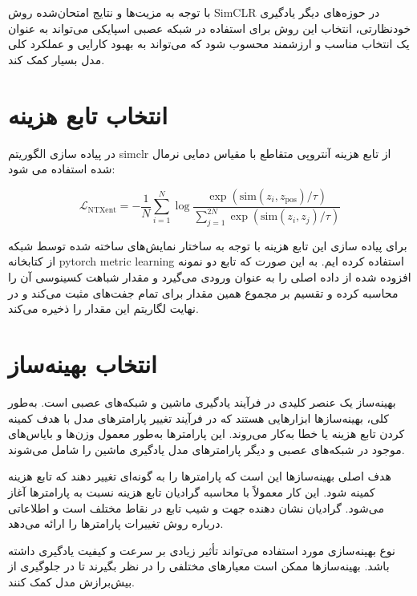 با توجه به مزیت‌ها و نتایج امتحان‌شده روش SimCLR در حوزه‌های دیگر یادگیری خودنظارتی، انتخاب این روش برای استفاده در شبکه عصبی اسپایکی می‌تواند به عنوان یک انتخاب مناسب و ارزشمند محسوب شود که می‌تواند به بهبود کارایی و عملکرد کلی مدل بسیار کمک کند.







\section{انتخاب تابع هزینه}

در پیاده سازی الگوریتم simclr از تابع هزینه آنتروپی متقاطع با مقیاس دمایی نرمال شده استفاده می شود:


\begin{equation}
	\mathcal{L}_{\text{NTXent}} = -\frac{1}{N} \sum_{i=1}^{N} \log \frac{\exp(\text{sim}(z_i, z_{\text{pos}}) / \tau)}{\sum_{j=1}^{2N} \exp(\text{sim}(z_i, z_j) / \tau)}
\end{equation}

برای پیاده سازی این تابع هزینه با توجه به ساختار نمایش‌های ساخته شده توسط شبکه از کتابخانه pytorch metric learning استفاده کرده ایم. به این صورت که تابع دو نمونه افزوده شده از داده اصلی را به عنوان ورودی می‌گیرد و مقدار شباهت کسینوسی آن را محاسبه کرده و تقسیم بر مجموع همین مقدار برای تمام جفت‌های مثبت می‌کند و در نهایت لگاریتم این مقدار را ذخیره می‌کند.



\section{انتخاب بهینه‌ساز}

بهینه‌ساز یک عنصر کلیدی در فرآیند یادگیری ماشین و شبکه‌های عصبی است. به‌طور کلی، بهینه‌سازها ابزارهایی هستند که در فرآیند تغییر پارامترهای مدل با هدف کمینه کردن تابع هزینه یا خطا به‌کار می‌روند. این پارامترها به‌طور معمول وزن‌ها و بایاس‌های موجود در شبکه‌های عصبی و دیگر پارامترهای مدل یادگیری ماشین را شامل می‌شوند.

هدف اصلی بهینه‌سازها این است که پارامترها را به گونه‌ای تغییر دهند که تابع هزینه کمینه شود. این کار معمولاً با محاسبه گرادیان تابع هزینه نسبت به پارامترها آغاز می‌شود. گرادیان نشان دهنده جهت و شیب تابع در نقاط مختلف است و اطلاعاتی درباره روش تغییرات پارامترها را ارائه می‌دهد.

نوع بهینه‌سازی مورد استفاده می‌تواند تأثیر زیادی بر سرعت و کیفیت یادگیری داشته باشد. بهینه‌سازها ممکن است معیارهای مختلفی را در نظر بگیرند تا در جلوگیری از بیش‌برازش  مدل کمک کنند.

